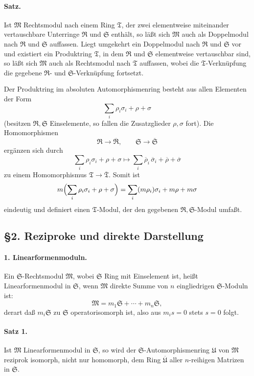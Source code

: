 \documentclass[11pt]{article}
\providecommand{\frR}{\mathfrak R}
\providecommand{\frS}{\mathfrak S}
\providecommand{\frT}{\mathfrak T}
\providecommand{\frM}{\mathfrak M}
\providecommand{\frU}{\mathfrak U}
\begin{document}
\paragraph{Satz.}
Ist \(\frM\) Rechtsmodul nach einem Ring \(\frT\), der zwei elementweise miteinander vertauschbare Unterringe \(\frR\) und \(\frS\) enthält, so läßt sich \(\frM\) auch als Doppelmodul nach \(\frR\) und \(\frS\) auffassen. Liegt umgekehrt ein Doppelmodul nach \(\frR\) und \(\frS\) vor und existiert ein Produktring \(\frT\), in dem \(\frR\) und \(\frS\) elementweise vertauschbar sind, so läßt sich \(\frM\) auch als Rechtsmodul nach \(\frT\) auffassen, wobei die \(\frT\)-Verknüpfung die gegebene \(\frR\)- und \(\frS\)-Verknüpfung fortsetzt.

Der Produktring im absoluten Automorphismenring besteht aus allen Elementen der Form
\[
        \sum_i \rho_i\sigma_i+\rho+\sigma
\]
(besitzen \(\frR,\frS\) Einselemente, so fallen die Zusatzglieder \(\rho,\sigma\) fort). Die Homomorphismen
\[
        \frR\to\overline{\frR},\qquad \frS\to\overline{\frS}
\]
ergänzen sich durch
\[
        \sum_i \rho_i\sigma_i+\rho+\sigma
        \longmapsto
        \sum_i \overline\rho_i\,\overline\sigma_i+\overline\rho+\overline\sigma
\]
zu einem Homomorphismus \(\frT\to\overline{\frT}\). Somit ist
\[
        m\Bigl(\sum_i \rho_i\sigma_i+\rho+\sigma\Bigr)
        =\sum_i (m\rho_i)\sigma_i+m\rho+m\sigma
\]
eindeutig und definiert einen \(\frT\)-Modul, der den gegebenen \(\frR,\frS\)-Modul umfaßt.

\subsection*{§2. Reziproke und direkte Darstellung}

\paragraph{1. Linearformenmoduln.}
Ein \(\frS\)-Rechtsmodul \(\frM\), wobei \(\frS\) Ring mit Einselement ist, heißt Linearformenmodul in \(\frS\), wenn \(\frM\) direkte Summe von \(n\) eingliedrigen \(\frS\)-Moduln ist:
\[
        \frM=m_1\frS+\cdots+m_n\frS,
\]
derart daß \(m_i\frS\) zu \(\frS\) operatorisomorph ist, also aus \(m_i s=0\) stets \(s=0\) folgt.

\paragraph{Satz 1.}
Ist \(\frM\) Linearformenmodul in \(\frS\), so wird der \(\frS\)-Automorphismenring \(\frU\) von \(\frM\) reziprok isomorph, nicht nur homomorph, dem Ring \(\overline{\frU}\) aller \(n\)-reihigen Matrizen in \(\frS\).
\end{document}
